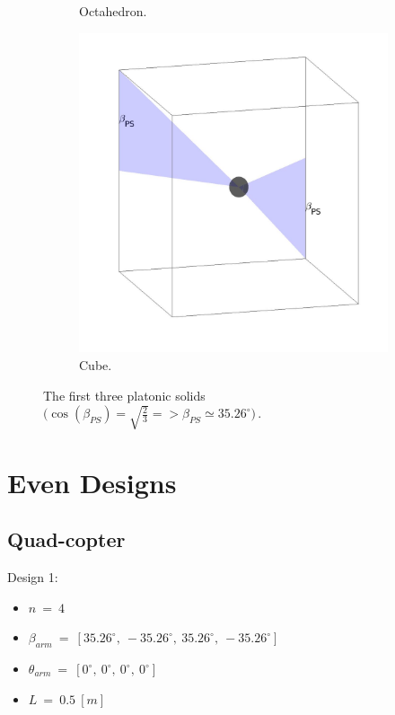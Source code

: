 \begin{figure}[!h]
\begin{subfigure}[b]{0.27\textwidth}
    \caption{Octahedron.} \label{fig:octahedron}
  \end{subfigure}
  \hspace*{\fill} %
  \begin{subfigure}[b]{0.26\textwidth}
    \includegraphics[width=\linewidth]{images/cube.jpg}
    \caption{Cube.} \label{fig:cube}
  \end{subfigure}
  \caption{The first three platonic solids $\big(\cos(\beta_{PS}) = \sqrt{\frac{2}{3}}
  =>  \beta_{PS} \simeq 35.26^{\circ}\big)\, .$}
  \label{fig:platonic_solid}
\end{figure}



\section{Even Designs}
\label{sec:even_designs}

\subsection{Quad-copter}
\label{sec:quad_copter}
Design 1:
\begin{itemize}
  \item $n\ =\ 4$
  \item $\beta_{arm}\ =\ [35.26^{\circ},\  -35.26^{\circ},\  35.26^{\circ},\  -35.26^{\circ}]$
  \item $\theta_{arm}\ =\ [0^{\circ},\  0^{\circ},\  0^{\circ},\  0^{\circ}]$
  \item $L\ =\ 0.5\ [m]$
\end{itemize}


